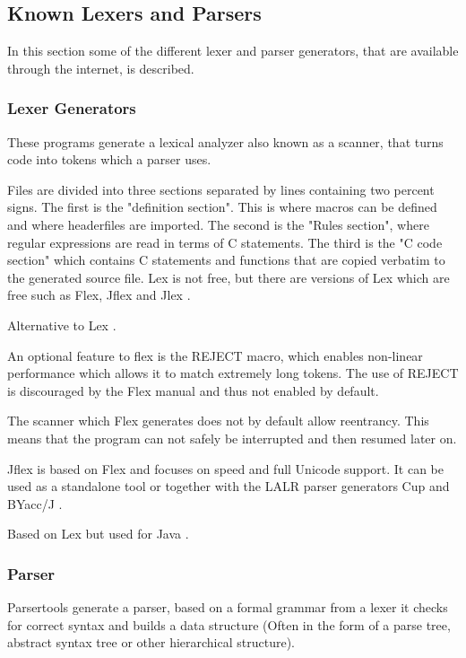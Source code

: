 \subsection{Known Lexers and Parsers}
\label{sec:KnownLexersAndParsers}

In this section some of the different lexer and parser generators, that are available through the internet, is described.

\subsubsection{Lexer Generators}
These programs generate a lexical analyzer also known as a scanner, that turns code into tokens which a parser uses.

Files are divided into three sections separated by lines containing two percent signs. The first is the "definition section". This is where macros can be defined and where headerfiles are imported. The second is the "Rules section", where regular expressions are read in terms of C statements. The third is the "C code section" which contains C statements and functions that are copied verbatim to the generated source file. Lex is not free, but there are versions of Lex which are free such as Flex, Jflex and Jlex \citep{Lex}.

Alternative to Lex \citep{Flex}.

An optional feature to flex is the REJECT macro, which enables non-linear performance which allows it to match extremely long tokens. The use of REJECT is discouraged by the Flex manual and thus not enabled by default. 

The scanner which Flex generates does not by default allow reentrancy. This means that the program can not safely be interrupted and then resumed later on.

Jflex is based on Flex and focuses on speed and full Unicode support. It can be used as a standalone tool or together with the LALR parser generators Cup and BYacc/J \citep{Jflex}.

Based on Lex but used for Java \citep{Jlex}.

\subsubsection{Parser}
Parsertools generate a parser, based on a formal grammar from a lexer it checks for correct syntax and builds a data structure (Often in the form of a parse tree, abstract syntax tree or other hierarchical structure). 

